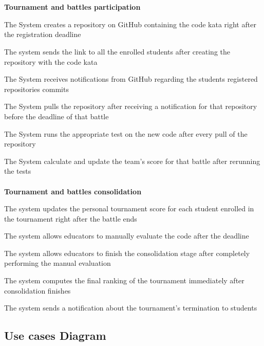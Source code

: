 \begin{enumerate}[label={[R\arabic*]}]
    \\  \\  \textbf{Tournament and battles participation}
    \item The System creates a repository on GitHub containing the code kata right after the registration deadline
    \item The system sends the link to all the enrolled students after creating the repository with the code kata
    \item The System receives notifications from GitHub regarding the students registered repositories commits
    \item The System pulls the repository after receiving a notification for that repository before the deadline of that battle
    \item The System runs the appropriate test on the new code after every pull of the repository
    \item The System calculate and update the team's score for that battle after rerunning the tests
    \\  \\  \textbf{Tournament and battles consolidation}
    \item The system updates the personal tournament score for each student enrolled in the tournament right after the battle ends
    \item The system allows educators to manually evaluate the code after the deadline
    \item The system  allows educators to finish the consolidation stage after completely performing the manual evaluation
    \item The system computes the final ranking of the tournament immediately after consolidation finishes
    \item The system  sends a notification about the tournament's termination to students 
\end{enumerate}

\subsection{Use cases Diagram}

